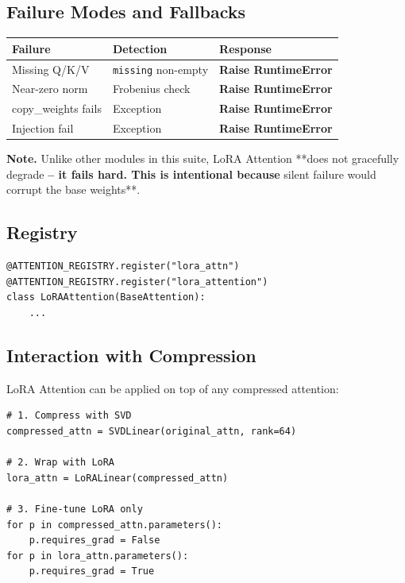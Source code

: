 \subsection{Failure Modes and Fallbacks}

\begin{table}[H]
\centering
\small
\begin{tabular}{lll}
\toprule
\textbf{Failure} & \textbf{Detection} & \textbf{Response} \\
\midrule
Missing Q/K/V & \texttt{missing} non-empty & \textbf{Raise RuntimeError} \\
Near-zero norm & Frobenius check & \textbf{Raise RuntimeError} \\
copy\_weights fails & Exception & \textbf{Raise RuntimeError} \\
Injection fail & Exception & \textbf{Raise RuntimeError} \\
\bottomrule
\end{tabular}
\end{table}

\textbf{Note.} Unlike other modules in this suite, LoRA Attention **does not 
gracefully degrade\textbf{ -- it fails hard. This is intentional because }silent 
failure would corrupt the base weights**.

\subsection{Registry}

\begin{lstlisting}
@ATTENTION_REGISTRY.register("lora_attn")
@ATTENTION_REGISTRY.register("lora_attention")
class LoRAAttention(BaseAttention):
    ...
\end{lstlisting}

\subsection{Interaction with Compression}

LoRA Attention can be applied on top of any compressed attention:

\begin{lstlisting}
# 1. Compress with SVD
compressed_attn = SVDLinear(original_attn, rank=64)

# 2. Wrap with LoRA
lora_attn = LoRALinear(compressed_attn)

# 3. Fine-tune LoRA only
for p in compressed_attn.parameters():
    p.requires_grad = False
for p in lora_attn.parameters():
    p.requires_grad = True
\end{lstlisting}

